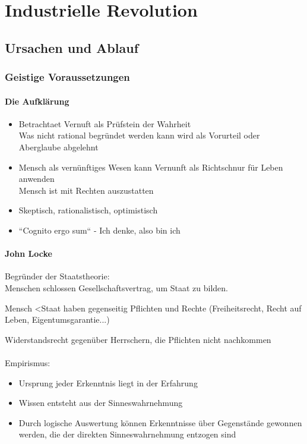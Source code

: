 \documentclass{report}
\begin{document}
\chapter{Industrielle Revolution}
\section{Ursachen und Ablauf}
\subsection{Geistige Voraussetzungen}
\subsubsection{Die Aufklärung}
\begin{itemize}
	\item Betrachtaet Vernuft als Prüfstein der Wahrheit\\
		\arrow Was nicht rational begründet werden kann wird als Vorurteil oder Aberglaube abgelehnt
	\item Mensch als vernünftiges Wesen kann Vernunft als Richtschnur für Leben anwenden\\
		\arrow Mensch ist mit Rechten auszustatten
	\item Skeptisch, rationalistisch, optimistisch
	\item ``Cognito ergo sum`` - Ich denke, also bin ich
\end{itemize}

\subsubsection{John Locke}
Begründer der Staatstheorie:\\
Menschen schlossen Gesellschaftsvertrag, um Staat zu bilden.

Mensch \textless \arrow Staat haben gegenseitig Pflichten und Rechte (Freiheitsrecht, Recht auf Leben, Eigentumsgarantie...)

Widerstandsrecht gegenüber Herrschern, die Pflichten nicht nachkommen\\\\
Empirismus:
\begin{itemize}
	\item Ursprung jeder Erkenntnis liegt in der Erfahrung
	\item Wissen entsteht aus der Sinneswahrnehmung
	\item Durch logische Auswertung können Erkenntnisse über Gegenstände gewonnen werden, die der direkten Sinneswahrnehmung entzogen sind
\end{itemize}
\end{document}
